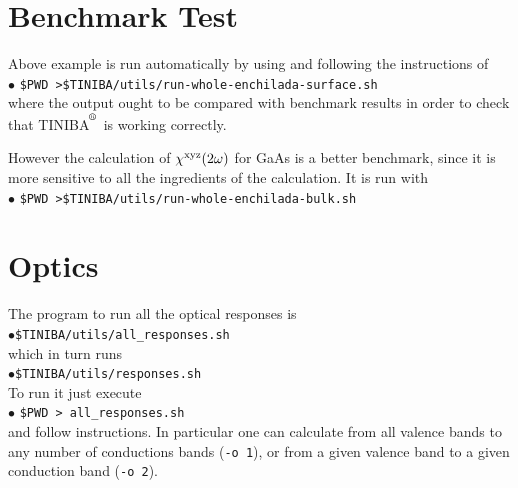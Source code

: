 \documentclass[openany,oneside]{book}
\def\reg{\textsuperscript{\textregistered}}
\numberwithin{equation}{section}
\begin{document}
\section{Benchmark Test}

Above example is run automatically by using and following the
instructions of\\
$\bullet$ \verb=$PWD >$TINIBA/utils/run-whole-enchilada-surface.sh=\\
where the output ought to be compared with benchmark results in order
to check that TINIBA$^{\reg}$ is working correctly.

However the calculation of $\chi^{\mathrm{x}\mathrm{y}\mathrm{z}}(2\omega)$ for GaAs is a
better benchmark, since it is more sensitive to all the ingredients of
the calculation. It is run with\\
$\bullet$ \verb=$PWD >$TINIBA/utils/run-whole-enchilada-bulk.sh=\\

\section{Optics}
 
The program to run all the optical responses is\\
$\bullet$\verb=$TINIBA/utils/all_responses.sh=\\ 
which in turn runs\\
$\bullet$\verb=$TINIBA/utils/responses.sh=\\
To run it just execute\\
$\bullet$ \verb=$PWD > all_responses.sh= \\
and follow instructions. In particular one can calculate from all
valence bands to any number of conductions bands (\verb=-o 1=),
or from a given valence band to a given conduction band (\verb=-o 2=).
\end{document}
